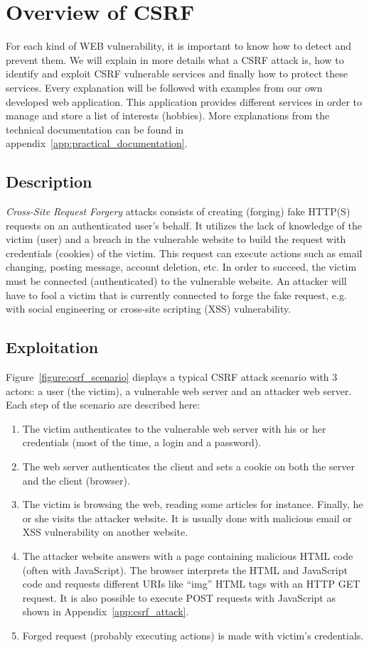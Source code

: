 \documentclass[a4paper,11pt,openany]{report}
\newcommand{\csrf}{\textit{Cross-Site Request Forgery}}
\begin{document}
  \section{Overview of CSRF}
  For each kind of WEB vulnerability, it is important to know how to detect and prevent them. 
  We will explain in more details what a CSRF attack is, how to identify and exploit CSRF 
  vulnerable services and finally how to protect these services. 
  Every explanation will be followed with examples from our own developed web application. 
  This application provides different services in order to manage and store a list of 
  interests (hobbies). More explanations from the technical documentation can be found 
  in appendix~\ref{app:practical_documentation}.
  
  \subsection{Description}
  \csrf{} attacks consists of creating (forging) fake HTTP(S) requests on an authenticated 
  user's behalf. It utilizes the lack of knowledge of the victim (user) and a breach in 
  the vulnerable website to build the request with credentials (cookies) of the victim. This 
  request can execute actions such as email changing, posting message, account deletion, etc.
  In order to succeed, the victim must be connected (authenticated) to the vulnerable website. 
  An attacker will have to fool a victim that is currently connected to forge the fake request, 
  e.g. with social engineering or cross-site scripting (XSS)\cite{wikipedia_xss} vulnerability.
  
  \subsection{Exploitation}
  Figure~\ref{figure:csrf_scenario} displays a typical CSRF attack scenario with 3 actors: a 
  user (the victim), a vulnerable web server and an attacker web server. Each step of the 
  scenario are described here:
  \begin{enumerate}
   \item The victim authenticates to the vulnerable web server with his or her credentials (most 
   of the time, a login and a password).
   \item The web server authenticates the client and sets a cookie on both the server and the client (browser).
   \item The victim is browsing the web, reading some articles for instance. Finally, he or 
   she visits the attacker website. It is usually done with malicious email or XSS vulnerability 
   on another website.
   \item The attacker website answers with a page containing malicious HTML code (often with 
   JavaScript). The browser interprets the HTML and JavaScript code and requests different URIs like 
   ``img'' HTML tags with an HTTP GET request. It is also possible to execute POST requests with 
   JavaScript as shown in Appendix~\ref{app:csrf_attack}.
   \item Forged request (probably executing actions) is made with victim's credentials.
  \end{enumerate}
  
\end{document}
